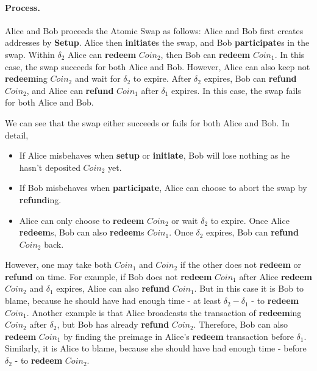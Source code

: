 \paragraph{Process.}
Alice and Bob proceeds the Atomic Swap as follows:
Alice and Bob first creates addresses by \textbf{Setup}.
Alice then \textbf{initiate}s the swap, and Bob \textbf{participate}s in the swap.
Within $\delta_2$ Alice can \textbf{redeem} $Coin_2$, then Bob can \textbf{redeem} $Coin_1$.
In this case, the swap succeeds for both Alice and Bob.
However, Alice can also keep not \textbf{redeem}ing $Coin_2$ and wait for $\delta_2$ to expire.
After $\delta_2$ expires, Bob can \textbf{refund} $Coin_2$, and Alice can \textbf{refund} $Coin_1$ after $\delta_1$ expires.
In this case, the swap fails for both Alice and Bob.

We can see that the swap either succeeds or fails for both Alice and Bob.
In detail,

\begin{itemize}
    \item If Alice misbehaves when \textbf{setup} or \textbf{initiate}, Bob will lose nothing as he hasn't deposited $Coin_2$ yet.
    \item If Bob misbehaves when \textbf{participate}, Alice can choose to abort the swap by \textbf{refund}ing.
    \item Alice can only choose to \textbf{redeem} $Coin_2$ or wait $\delta_2$ to expire.
    Once Alice \textbf{redeem}s, Bob can also \textbf{redeem}s $Coin_1$.
    Once $\delta_2$ expires, Bob can \textbf{refund} $Coin_2$ back.
\end{itemize}

However, one may take both $Coin_1$ and $Coin_2$ if the other does not \textbf{redeem} or \textbf{refund} on time.
For example, if Bob does not \textbf{redeem} $Coin_1$ after Alice \textbf{redeem} $Coin_2$ and $\delta_1$ expires, Alice can also \textbf{refund} $Coin_1$.
But in this case it is Bob to blame, because he should have had enough time - at least $\delta_2 - \delta_1$ - to \textbf{redeem} $Coin_1$.
Another example is that Alice broadcasts the transaction of \textbf{redeem}ing $Coin_2$ after $\delta_2$, but Bob has already \textbf{refund} $Coin_2$.
Therefore, Bob can also \textbf{redeem} $Coin_1$ by finding the preimage in Alice's \textbf{redeem} transaction before $\delta_1$.
Similarly, it is Alice to blame, because she should have had enough time - before $\delta_2$ - to \textbf{redeem} $Coin_2$.

